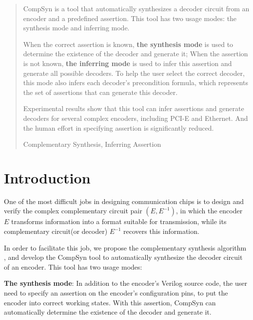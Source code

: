 \documentclass[runningheads,a4paper]{llncs}
\newcommand{\keywords}[1]{\par\addvspace\baselineskip
\noindent\keywordname\enspace\ignorespaces#1}
\begin{document}
\begin{abstract}
CompSyn is a tool that automatically synthesizes a decoder circuit from an encoder and a predefined assertion.
This tool has two usage modes: the synthesis mode and inferring mode.

\vspace{0.1cm}

When the correct assertion is known,
\textbf{the synthesis mode} is used to determine the existence of the decoder and generate it;
When the assertion is not known,
\textbf{the inferring mode} is used to infer this assertion and generate all possible decoders.
To help the user select the correct decoder,
this mode also infers each decoder's precondition formula,
which represents the set of assertions that can generate this decoder.

\vspace{0.1cm}

Experimental results show that
this tool can infer assertions and generate decoders for several complex encoders,
including PCI-E and Ethernet.
And the human effort in specifying assertion is significantly reduced.

\keywords{Complementary Synthesis, Inferring Assertion}
\end{abstract}


\section{Introduction}\label{sec_intro}
One of the most difficult jobs in designing communication chips
is to design and verify the complex complementary circuit pair $(E,E^{-1})$,
in which the encoder $E$ transforms information into a format suitable for transmission,
while its complementary circuit(or decoder) $E^{-1}$ recovers this information.

In order to facilitate this job,
we propose the complementary synthesis algorithm \cite{ShengYuShen:iccad09,ShengYuShen:tcad,ShengYuShen:tcad11,ShengYuShen:iccad11},
and develop the CompSyn tool to automatically synthesize the decoder circuit of an encoder.
This tool has two usage modes:

\textbf{The synthesis mode}:
In addition to the encoder's Verilog source code,
the user need to specify an assertion on the encoder's configuration pins,
to put the encoder into correct working states.
With this assertion,
CompSyn can automatically determine the existence of the decoder\cite{ShengYuShen:tcad11} and generate it\cite{ShengYuShen:tcad}.
\end{document}
